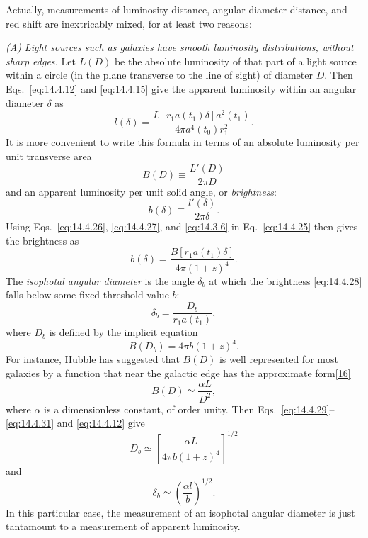 Actually, measurements of luminosity distance, angular diameter distance,
and red shift are inextricably mixed, for at least two reasons:

\medskip
\noindent\textit{(A) Light sources such as galaxies have smooth luminosity
distributions, without sharp edges.}
Let \(L(D)\) be the absolute luminosity of that part of a light source within
a circle (in the plane transverse to the line of sight) of diameter \(D\).
Then Eqs.~\eqref{eq:14.4.12} and \eqref{eq:14.4.15} give the apparent
luminosity within an angular diameter \(\delta\) as
\begin{equation}
  l(\delta)
  =
  \frac{
    L\!\left[r_1a(t_1)\delta\right]a^2(t_1)
  }{
    4\pi a^4(t_0)r_1^2
  }.
  \tag{14.4.25}\label{eq:14.4.25}
\end{equation}
It is more convenient to write this formula in terms of an absolute
luminosity per unit transverse area
\begin{equation}
  B(D)\equiv\frac{L'(D)}{2\pi D}
  \tag{14.4.26}\label{eq:14.4.26}
\end{equation}
and an apparent luminosity per unit solid angle, or \emph{brightness}:
\begin{equation}
  b(\delta)\equiv\frac{l'(\delta)}{2\pi\delta}.
  \tag{14.4.27}\label{eq:14.4.27}
\end{equation}
Using Eqs.~\eqref{eq:14.4.26}, \eqref{eq:14.4.27}, and
\eqref{eq:14.3.6} in Eq.~\eqref{eq:14.4.25} then gives the brightness as
\begin{equation}
  b(\delta)
  =
  \frac{
    B\!\left[r_1a(t_1)\delta\right]
  }{
    4\pi(1+z)^4
  }.
  \tag{14.4.28}\label{eq:14.4.28}
\end{equation}
The \emph{isophotal angular diameter} is the angle \(\delta_b\) at which the
brightness \eqref{eq:14.4.28} falls below some fixed threshold value \(b\):
\begin{equation}
  \delta_b=\frac{D_b}{r_1a(t_1)},
  \tag{14.4.29}\label{eq:14.4.29}
\end{equation}
where \(D_b\) is defined by the implicit equation
\begin{equation}
  B(D_b)=4\pi b(1+z)^4.
  \tag{14.4.30}\label{eq:14.4.30}
\end{equation}
For instance, Hubble has suggested that \(B(D)\) is well represented for
most galaxies by a function that near the galactic edge has the approximate
form\hyperref[ch14-ref-16]{[16]}
\begin{equation}
  B(D)\simeq\frac{\alpha L}{D^2},
  \tag{14.4.31}\label{eq:14.4.31}
\end{equation}
where \(\alpha\) is a dimensionless constant, of order unity. Then
Eqs.~\eqref{eq:14.4.29}--\eqref{eq:14.4.31} and
\eqref{eq:14.4.12} give
\begin{equation}
  D_b
  \simeq
  \left[
    \frac{\alpha L}{4\pi b(1+z)^4}
  \right]^{1/2}
  \tag{14.4.32}\label{eq:14.4.32}
\end{equation}
and
\begin{equation}
  \delta_b
  \simeq
  \left(\frac{\alpha l}{b}\right)^{1/2}.
  \tag{14.4.33}\label{eq:14.4.33}
\end{equation}
In this particular case, the measurement of an isophotal angular diameter is
just tantamount to a measurement of apparent luminosity.

